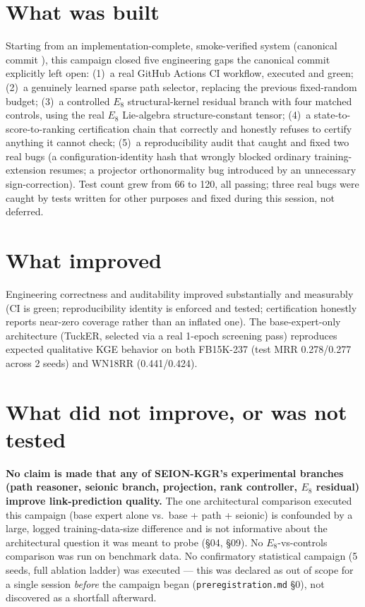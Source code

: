 \documentclass[11pt]{article}
\begin{document}

\section{What was built}
Starting from an implementation-complete, smoke-verified system (canonical commit
\texttt{\CanonicalSHA}), this campaign closed five engineering gaps the canonical commit
explicitly left open: (1)~a real GitHub Actions CI workflow, executed and green;
(2)~a genuinely learned sparse path selector, replacing the previous fixed-random budget;
(3)~a controlled $E_8$ structural-kernel residual branch with four matched controls, using the
real $E_8$ Lie-algebra structure-constant tensor; (4)~a state-to-score-to-ranking certification
chain that correctly and honestly refuses to certify anything it cannot check; (5)~a reproducibility
audit that caught and fixed two real bugs (a configuration-identity hash that wrongly blocked
ordinary training-extension resumes; a projector orthonormality bug introduced by an unnecessary
sign-correction). Test count grew from 66 to 120, all passing; three real bugs were caught by
tests written for other purposes and fixed during this session, not deferred.

\section{What improved}
Engineering correctness and auditability improved substantially and measurably (CI is green;
reproducibility identity is enforced and tested; certification honestly reports near-zero coverage
rather than an inflated one). The base-expert-only architecture (TuckER, selected via a real
1-epoch screening pass) reproduces expected qualitative KGE behavior on both FB15K-237
(test MRR 0.278/0.277 across 2 seeds) and WN18RR (0.441/0.424).

\section{What did not improve, or was not tested}
\textbf{No claim is made that any of SEION-KGR's experimental branches (path reasoner, seionic
branch, projection, rank controller, $E_8$ residual) improve link-prediction quality.} The one
architectural comparison executed this campaign (base expert alone vs.\ base + path + seionic) is
confounded by a large, logged training-data-size difference and is not informative about the
architectural question it was meant to probe (\S04, \S09). No $E_8$-vs-controls comparison was run
on benchmark data. No confirmatory statistical campaign (5 seeds, full ablation ladder) was
executed --- this was declared as out of scope for a single session \emph{before} the campaign
began (\texttt{preregistration.md} \S0), not discovered as a shortfall afterward.
\end{document}
